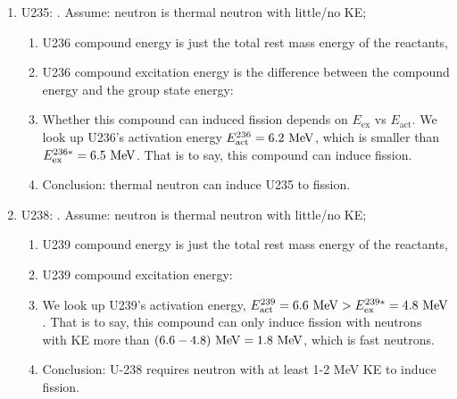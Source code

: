 \documentclass{school-22.101-notes}
\begin{document}
\begin{enumerate}
\item U235: . Assume: neutron is thermal neutron with little/no KE; 
    \begin{enumerate}
    \item U236 compound energy is just the total rest mass energy of the reactants, 
    \item U236 compound excitation energy is the difference between the compound energy and the group state energy:
    \item Whether this compound can induced fission depends on $E_{\mathrm{ex}}$ vs $E_{\mathrm{act}}$. We look up U236's activation energy $E_{\mathrm{act}}^{236} = 6.2 \mbox{ } \mathrm{MeV}$, which is smaller than $E_{\mathrm{ex}}^{236*} = 6.5 \mbox{ } \mathrm{MeV}$. That is to say, this compound can induce fission.
    \item Conclusion: thermal neutron can induce U235 to fission.  
    \end{enumerate}

\item U238: . Assume: neutron is thermal neutron with little/no KE; 
    \begin{enumerate}
    \item U239 compound energy is just the total rest mass energy of the reactants,  
    \item U239 compound excitation energy:
    \item We look up U239's activation energy, $E_{\mathrm{act}}^{239} = 6.6 \mbox{ } \mathrm{MeV} > E_{\mathrm{ex}}^{239*} = 4.8 \mbox{ } \mathrm{MeV}$. That is to say, this compound can only induce fission with neutrons with KE more than $(6.6-4.8) \mbox{ } \mathrm{MeV} = 1.8 \mbox{ } \mathrm{MeV}$, which is fast neutrons.
    \item Conclusion: U-238 requires neutron with at least 1-2 MeV KE to induce fission.  
    \end{enumerate}


\end{enumerate}
\end{document}
